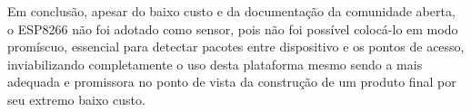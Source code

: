 Em conclusão, apesar do baixo custo e da documentação da comunidade aberta, o
ESP8266 não foi adotado como sensor, pois não foi possível colocá-lo em modo
promíscuo, essencial para detectar pacotes entre dispositivo e os pontos de
acesso, inviabilizando completamente o uso desta plataforma mesmo sendo a
mais adequada e promissora no ponto de vista da construção de um produto final
por seu extremo baixo custo.
